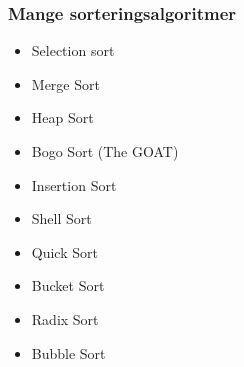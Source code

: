 \documentclass{article}
\begin{document}
    \subsubsection{Mange sorteringsalgoritmer}
    \begin{itemize}
        \item Selection sort
        \item Merge Sort
        \item Heap Sort
        \item Bogo Sort (The GOAT)
        \item Insertion Sort
        \item Shell Sort
        \item Quick Sort
        \item Bucket Sort
        \item Radix Sort
        \item Bubble Sort
    \end{itemize}

    \begin{figure}[H]
	\centering
\end{figure}
\end{document}

